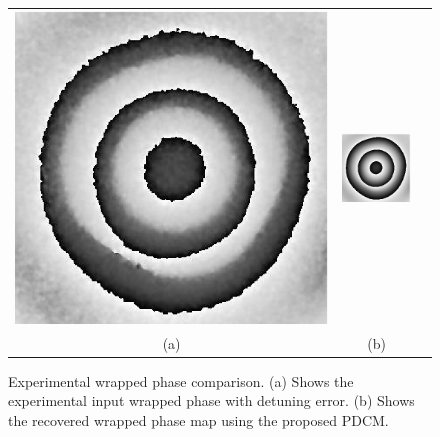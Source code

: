 \begin{figure}[Ht!]
  \begin{center}
    \begin{tabular}{c c c}
      \includegraphics[scale=.43]{Chpt4_figures/fig_E1.eps}&
      \includegraphics[scale=2.35]{Chpt4_figures/fig_E2.eps}\\
      (a) &  (b)
    \end{tabular}
  \end{center}
  \caption{Experimental wrapped phase comparison. (a) Shows the experimental
    input wrapped phase with detuning error. (b) Shows the recovered wrapped 
    phase map using the proposed PDCM.}
  \label{fig:ExperimentalPhase}
\end{figure}

